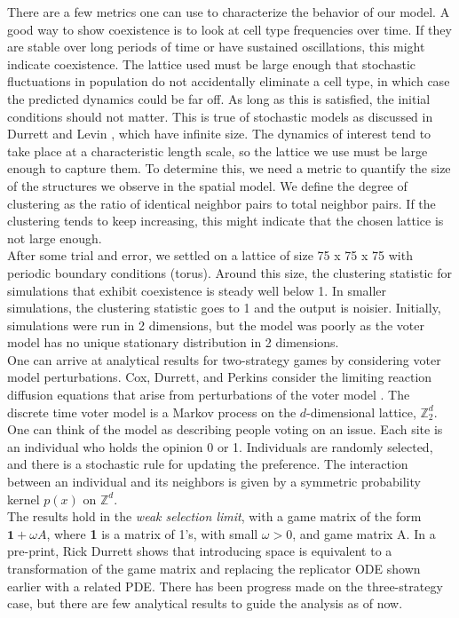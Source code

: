\documentclass[12pt]{report}
\begin{document}
There are a few metrics one can use to characterize the behavior of our model. A good way to show coexistence is to look at cell type frequencies over time. If they are stable over long periods of time or have sustained oscillations, this might indicate coexistence. The lattice used must be large enough that stochastic fluctuations in population do not accidentally eliminate a cell type, in which case the predicted dynamics could be far off. As long as this is satisfied, the initial conditions should not matter. This is true of stochastic models as discussed in Durrett and Levin \cite{Durrett1994}, which have infinite size. The dynamics of interest tend to take place at a characteristic length scale, so the lattice we use must be large enough to capture them. To determine this, we need a metric to quantify the size of the structures we observe in the spatial model. We define the degree of clustering as the ratio of identical neighbor pairs to total neighbor pairs. If the clustering tends to keep increasing, this might indicate that the chosen lattice is  not large enough.\\

After some trial and error, we settled on a lattice of size 75 x 75 x 75 with periodic boundary conditions (torus). Around this size, the clustering statistic for simulations that exhibit coexistence is steady well below 1. In smaller simulations, the clustering statistic goes to 1 and the output is noisier. Initially, simulations were run in 2 dimensions, but the model was poorly  as the voter model has no unique stationary distribution in 2 dimensions.\\

One can arrive at analytical results for two-strategy games by considering voter model perturbations. Cox, Durrett, and Perkins consider the limiting reaction diffusion equations that arise from perturbations of the voter model   \cite{Cox2011}. The discrete time voter model is a Markov process on the $d$-dimensional lattice, $\mathbb{Z}_2^d$. One can think of the model as describing people voting on an issue. Each site is an individual who holds the opinion 0 or 1. Individuals are randomly selected, and there is a stochastic rule for updating the preference. The interaction between an individual and its neighbors is given by a symmetric probability  kernel $p(x)$ on $\mathbb{Z}^d$. \\

The results hold in the \textit{weak selection limit}, with a game matrix of the form $\textbf{1} + \omega A$, where \textbf{1} is a matrix of 1's, with small $\omega > 0$, and game matrix A. In a pre-print, Rick Durrett shows that introducing space is equivalent to a transformation of the game matrix and replacing the replicator ODE shown earlier with a related PDE. There has been progress made on the three-strategy case, but there are few analytical results to guide the analysis as of now.\\
\end{document}

